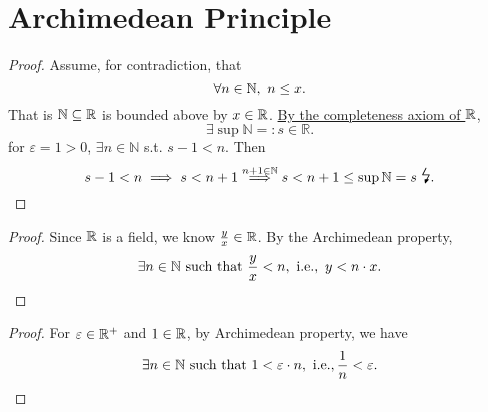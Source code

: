 \documentclass[11pt,openany]{article}
\begin{document}
\newpage
\section{Archimedean Principle}
\begin{center}

\end{center}
\begin{proof}
{\color{white}Assume, for contradiction, that \[
\forall n\in\mathbb{N},\ n\leq x.
\] That is $\mathbb{N}\subseteq\mathbb{R}$ is bounded above by $x\in\mathbb{R}$. \underline{By the completeness axiom of $\mathbb{R}$}, \[
\exists\sup\mathbb{N}=:s\in\mathbb{R}.
\] 
for $\varepsilon=1>0$, $\exists n\in\mathbb{N}$ s.t. $s-1<n$. Then \[
s-1<n\implies s<n+1\overset{n+1\in\N}{\implies}s<n+1\leq\sup\N=s\ \text{\Large\lightning}.
\]}
\end{proof}
\vfill
{}
\begin{center}

\end{center}
\begin{proof}
{\color{white}	Since $\mathbb{R}$ is a field, we know $\frac{y}{x}\in\mathbb{R}$. By the Archimedean property, \[
	\exists n\in\N\ \text{such that}\ \frac{y}{x}<n,\ \ie,\ y<n\cdot x.
	\]}
\end{proof}
\begin{center}
	
\end{center}
\begin{proof}
{\color{white}	For $\varepsilon\in\mathbb{R}^+$ and $1\in\mathbb{R}$, by Archimedean property, we have \[
	\exists n\in\N\ \text{such that}\ 1<\varepsilon\cdot n,\ \ie, \frac{1}{n}<\varepsilon.
	\]}
\end{proof}
\end{document}

